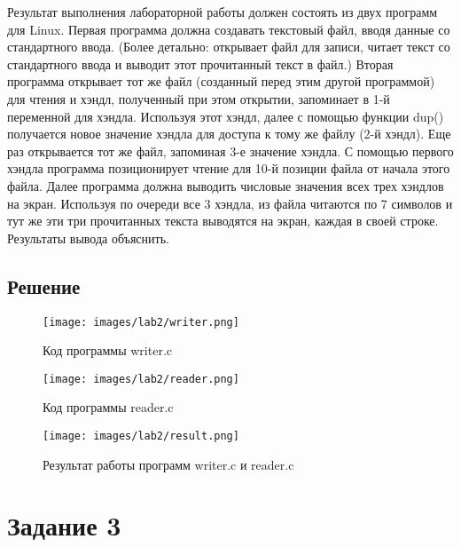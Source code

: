 \documentclass[14pt, a4paper]{article}
\begin{document}
    Результат выполнения лабораторной работы должен состоять из двух программ для Linux. Первая программа должна создавать текстовый файл, вводя данные со стандартного ввода. (Более детально: открывает файл для записи, читает текст со стандартного ввода и выводит этот прочитанный текст в файл.) Вторая программа открывает тот же файл (созданный перед этим другой программой) для чтения и хэндл, полученный при этом открытии, запоминает в 1-й переменной для хэндла. Используя этот хэндл, далее с помощью функции dup() получается новое значение хэндла для доступа к тому же файлу (2-й хэндл). Еще раз открывается тот же файл, запоминая 3-е значение хэндла. С помощью первого хэндла программа позиционирует чтение для 10-й позиции файла от начала этого файла. Далее программа должна выводить числовые значения всех трех хэндлов на экран. Используя по очереди все 3 хэндла, из файла читаются по 7 символов и тут же эти три прочитанных текста выводятся на экран, каждая в своей строке. Результаты вывода объяснить.

    \subsection*{Решение}

    \begin{figure}[H]
        \centering
        \texttt{[image: images/lab2/writer.png]}
        \caption{Код программы writer.c}
    \end{figure}

    \begin{figure}[H]
        \centering
        \texttt{[image: images/lab2/reader.png]}
        \caption{Код программы reader.c}
    \end{figure}

    \begin{figure}[H]
        \centering
        \texttt{[image: images/lab2/result.png]}
        \caption{Результат работы программ writer.c и reader.c}
    \end{figure}

    \newpage

    \section*{Задание 3}
\end{document}
